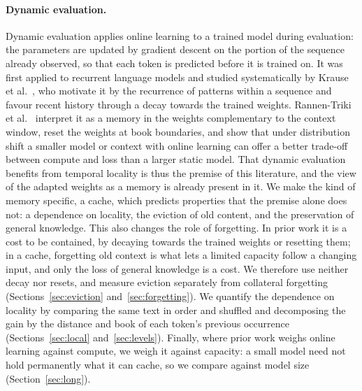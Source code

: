 \documentclass[10pt]{article}
\begin{document}
\paragraph{Dynamic evaluation.}
Dynamic evaluation applies online learning to a trained model during evaluation: the parameters are updated by gradient descent on the portion of the sequence already observed, so that each token is predicted before it is trained on.
It was first applied to recurrent language models \cite{mikolov2010recurrent,graves2013generating} and studied systematically by Krause et al.\ \cite{krause2018dynamic,krause2019dynamic}, who motivate it by the recurrence of patterns within a sequence and favour recent history through a decay towards the trained weights.
Rannen-Triki et al.\ \cite{rannentriki2024revisiting} interpret it as a memory in the weights complementary to the context window, reset the weights at book boundaries, and show that under distribution shift a smaller model or context with online learning can offer a better trade-off between compute and loss than a larger static model.
That dynamic evaluation benefits from temporal locality is thus the premise of this literature, and the view of the adapted weights as a memory is already present in it. We make the kind of memory specific, a cache, which predicts properties that the premise alone does not: a dependence on locality, the eviction of old content, and the preservation of general knowledge. This also changes the role of forgetting.
In prior work it is a cost to be contained, by decaying towards the trained weights or resetting them; in a cache, forgetting old context is what lets a limited capacity follow a changing input, and only the loss of general knowledge is a cost. We therefore use neither decay nor resets, and measure eviction separately from collateral forgetting (Sections~\ref{sec:eviction} and~\ref{sec:forgetting}).
We quantify the dependence on locality by comparing the same text in order and shuffled and decomposing the gain by the distance and book of each token's previous occurrence (Sections~\ref{sec:local} and~\ref{sec:levels}). Finally, where prior work weighs online learning against compute, we weigh it against capacity: a small model need not hold permanently what it can cache, so we compare against model size (Section~\ref{sec:long}).
\end{document}
